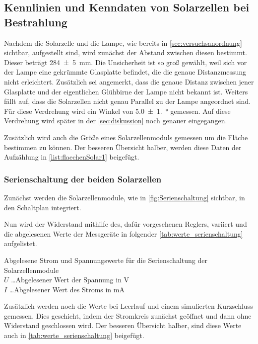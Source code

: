 \documentclass[12pt,english,ngerman]{scrartcl}
\begin{document}
\subsection{Kennlinien und Kenndaten von Solarzellen bei Bestrahlung}

Nachdem die Solarzelle und die Lampe, wie bereits in
\autoref{sec:versuchsanordnung} sichtbar, aufgestellt sind, wird zunächst der
Abstand zwischen diesen bestimmt. Dieser beträgt \SI{284(5)}{\mm}. Die
Unsicherheit ist so groß gewählt, weil sich vor der Lampe eine gekrümmte
Glasplatte befindet, die die genaue Distanzmessung nicht erleichtert.
Zusätzlich sei angemerkt, dass die genaue Distanz zwischen jener Glasplatte und
der eigentlichen Glühbirne der Lampe nicht bekannt ist. Weiters fällt auf, dass
die Solarzellen nicht genau Parallel zu der Lampe angeordnet sind. Für diese
Verdrehung wird ein Winkel von \SI{5.0(1.0)}{\degree} gemessen. Auf diese
Verdrehung wird später in der \autoref{sec:diskussion} noch genauer
eingegangen.

Zusätzlich wird auch die Größe eines Solarzellenmoduls gemessen um die Fläche
bestimmen zu können. Der besseren Übersicht halber, werden diese Daten der
Aufzählung in \cref{list:flaechenSolar1} beigefügt.

\subsubsection{Serienschaltung der beiden Solarzellen}

Zunächst werden die Solarzellenmodule, wie in \autoref{fig:Serienschaltung}
sichtbar, in den Schaltplan integriert.

Nun wird der Widerstand mithilfe des, dafür vorgesehenen Reglers, variiert und
die abgelesenen Werte der Messgeräte in folgender
\autoref{tab:werte_serienschaltung} aufgelistet.

\begin{table}[]
	\caption[Abgelesene Strom und Spannungswerte für die Serienschaltung der
		Solarzellenmodule] {Abgelesene Strom und Spannungswerte für die Serienschaltung
		der Solarzellenmodule                        \\
		$U$ \dots Abgelesener Wert der Spannung in V \\
		$I$ \dots Abgelesener Wert des Stroms in mA
	}\label{tab:werte_serienschaltung}
	\centering
	
\end{table}

Zusätzlich werden noch die Werte bei Leerlauf und einem simulierten Kurzschluss
gemessen. Dies geschieht, indem der Stromkreis zunächst geöffnet und dann ohne
Widerstand geschlossen wird. Der besseren Übersicht halber, sind diese Werte
auch in \autoref{tab:werte_serienschaltung} beigefügt.
\end{document}
